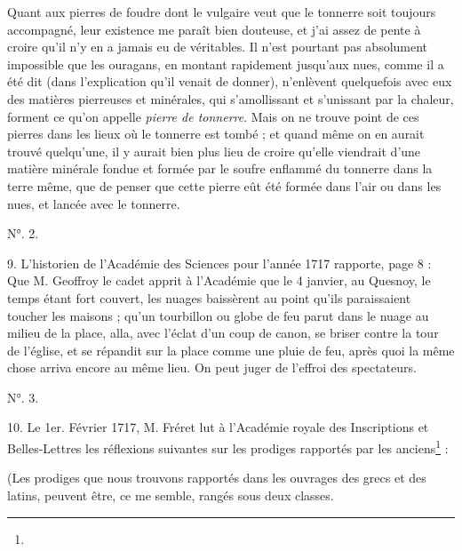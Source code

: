 \documentclass[a4paper, 11pt, oneside, polutonikogreek, french]{article}
\begin{document}
\og Quant aux pierres de foudre dont le vulgaire veut que le tonnerre soit toujours accompagné, leur existence me paraît bien douteuse, et j'ai assez de pente à croire qu'il n'y en a jamais eu de véritables. Il n'est pourtant pas absolument impossible que les ouragans, en montant rapidement jusqu'aux nues, comme il a été dit (dans l'explication qu'il venait de donner), n'enlèvent quelquefois avec eux des matières pierreuses et minérales, qui s'amollissant et s'unissant par la chaleur, forment ce qu'on appelle \emph{pierre de tonnerre}. Mais on ne trouve point de ces pierres dans les lieux où le tonnerre est tombé ; et quand même on en aurait trouvé quelqu'une, il y aurait bien plus lieu de croire qu'elle viendrait d'une matière minérale fondue et formée par le soufre enflammé du tonnerre dans la terre même, que de penser que cette pierre eût été formée dans l'air ou dans les nues, et lancée avec le tonnerre. \fg

\begin{center}
N°. 2.
\end{center}

9. L'historien de l'Académie des Sciences pour l'année 1717 rapporte, page 8 : \og Que M. Geoffroy le cadet apprit à l'Académie que le 4 janvier, au Quesnoy, le temps étant fort couvert, les nuages baissèrent au point qu'ils paraissaient toucher les maisons ; qu'un tourbillon ou globe de feu parut dans le nuage au milieu de la place, alla, avec l'éclat d'un coup de canon, se briser contre la tour de l'église, et se répandit sur la place comme une pluie de feu, après quoi la même chose arriva encore au même lieu. On peut juger de l'effroi des spectateurs. \fg

\begin{center}
N°. 3.
\end{center}

10. Le 1er. Février 1717, M. Fréret lut à l'Académie royale des Inscriptions et Belles-Lettres les réflexions suivantes sur les prodiges rapportés par les anciens\footnote{} :

\og (Les prodiges que nous trouvons rapportés dans les ouvrages des grecs et des latins, peuvent être, ce me semble, rangés sous deux classes. \fg
\end{document}
